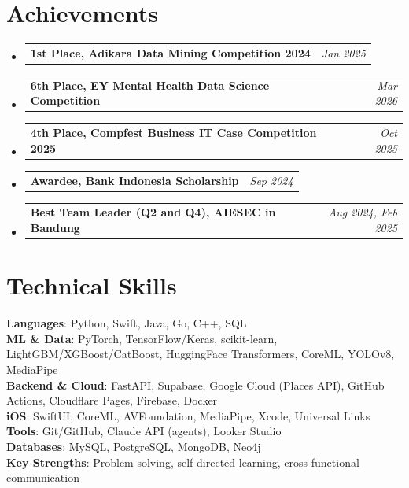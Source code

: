 \documentclass[a4paper,11pt]{article}
\makeatletter
\newcommand{\resumePOR}[3]{
\vspace{0.5mm}\item
    \begin{tabular*}{0.97\textwidth}[t]{l@{\extracolsep{\fill}}r}
        \textbf{#1}\hspace{0.3mm}#2 & \textit{\small{#3}}
    \end{tabular*}
    \vspace{-2mm}
}
\newcommand{\resumeSubHeadingListStart}{\begin{itemize}[leftmargin=*,labelsep=0mm]}
\newcommand{\resumeSubHeadingListEnd}{\end{itemize}\vspace{2mm}}
\makeatother
\begin{document}
\section{\textbf{Achievements}}
\resumeSubHeadingListStart
\resumePOR{1st Place, Adikara Data Mining Competition 2024}{}{Jan 2025}
\resumePOR{6th Place, EY Mental Health Data Science Competition}{}{Mar 2026}
\resumePOR{4th Place, Compfest Business IT Case Competition 2025}{}{Oct 2025}
\resumePOR{Awardee, Bank Indonesia Scholarship}{}{Sep 2024}
\resumePOR{Best Team Leader (Q2 and Q4), AIESEC in Bandung}{}{Aug 2024, Feb 2025}
\resumeSubHeadingListEnd
\vspace{-5.5mm}

\section{\textbf{Technical Skills}}
 \begin{itemize}[leftmargin=0.05in, label={}]
    \small{\item{
     \textbf{Languages}{: Python, Swift, Java, Go, C++, SQL} \\
     \textbf{ML \& Data}{: PyTorch, TensorFlow/Keras, scikit-learn, LightGBM/XGBoost/CatBoost, HuggingFace Transformers, CoreML, YOLOv8, MediaPipe} \\
     \textbf{Backend \& Cloud}{: FastAPI, Supabase, Google Cloud (Places API), GitHub Actions, Cloudflare Pages, Firebase, Docker} \\
     \textbf{iOS}{: SwiftUI, CoreML, AVFoundation, MediaPipe, Xcode, Universal Links} \\
     \textbf{Tools}{: Git/GitHub, Claude API (agents), Looker Studio} \\
     \textbf{Databases}{: MySQL, PostgreSQL, MongoDB, Neo4j} \\
     \textbf{Key Strengths}{: Problem solving, self-directed learning, cross-functional communication} \\
    }}
 \end{itemize}
 \vspace{-16pt}
\end{document}
